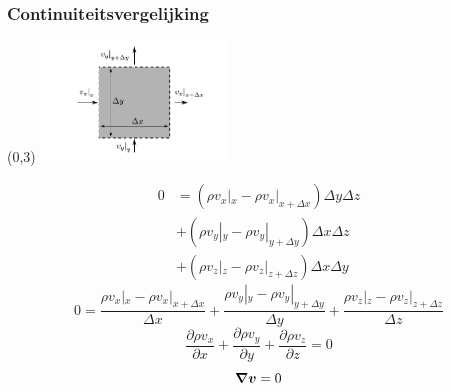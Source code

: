 \documentclass[t]{beamer}
\begin{document}
	\begin{frame}
		\frametitle{Continuiteitsvergelijking}
		\begin{textblock}{5}(0,3)
            \includegraphics[width=5cm]{../fig/deeltjesvergelijkingen/Continuiteitsvergelijking}
        \end{textblock}
  		\pause
  		\vspace{1.5cm}
  		\begin{align*}
			0 &= (\rho v_x|_{x} - \rho v_x|_{x+\Delta x})\Delta y \Delta z \\
			  &+ (\rho v_y|_{y} - \rho v_y|_{y+\Delta y})\Delta x \Delta z \\
			  &+ (\rho v_z|_{z} - \rho v_z|_{z+\Delta z})\Delta x \Delta y
		\end{align*}
		\pause
		\begin{equation*}
			0 = \frac{\rho v_x|_{x} - \rho v_x|_{x+\Delta x}}{\Delta x} + \frac{\rho v_y|_{y} - \rho v_y|_{y+\Delta y}}{\Delta y} + \frac{\rho v_z|_{z} - \rho v_z|_{z+\Delta z}}{\Delta z}
		\end{equation*}
		\pause
		\begin{equation*}
			\frac{\partial \rho v_x}{\partial x} + \frac{\partial \rho v_y}{\partial y} + \frac{\partial \rho v_z}{\partial z} = 0
		\end{equation*}
		\pause
		\begin{equation}
			\boldsymbol{\nabla} \boldsymbol{v} = 0
		\end{equation}
	\end{frame}	
\end{document}
